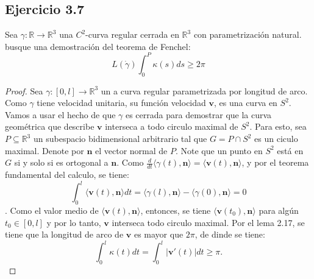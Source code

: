 \documentclass[12pt]{article}
\begin{document}
\subsection*{Ejercicio 3.7}
Sea $\gamma : \mathbb R \rightarrow \mathbb R^3$ una $C^2$-curva regular cerrada en $\mathbb R ^3$ con parametrizaci\'on natural. busque una demostraci\'on del teorema de Fenchel:
\begin{equation*}
L(\dot{\gamma})\int_{0}^{P} \kappa(s)ds \geq 2\pi
\end{equation*}
\begin{proof}
Sea $\gamma : [0, l] \rightarrow \mathbb R ^3$ un a curva regular parametrizada por longitud de arco. Como $\gamma$ tiene velocidad unitaria, su funci\'on velocidad $\textbf{v}$, es una curva en $S^2$. \\
Vamos a usar el hecho de que $\gamma $ es cerrada para demostrar que la curva geom\'etrica que describe $\textbf{v}$ interseca a todo circulo maximal de $S^2$. Para esto, sea $P \subseteq \mathbb R ^3$ un subespacio bidimensional arbitrario tal que $G=P \cap S^2$ es un ciculo maximal. Denote por $\textbf{n}$ el vector normal de $P$. Note que un punto en $S^2$ est\'a en $G$ si y solo si es ortogonal a $\textbf{n}$. Como $\frac{d}{dt}\langle \gamma(t), \textbf{n} \rangle=\langle \textbf{v} (t),\textbf{n}\rangle $, y por el teorema fundamental del calculo, se tiene:\\
 $$ \int_{0}^{l}{\langle \textbf{v}(t),\textbf{n} \rangle}dt = \langle \gamma (l),\textbf{n}\rangle -\langle \gamma (0), \textbf{n} \rangle = 0   $$.
 Como el valor medio de $\langle \textbf{v}(t), \textbf{n} \rangle$, entonces, se tiene $\langle \textbf{v}(t_0), \textbf{n} \rangle$ para alg\'un $t_0 \in [0,l]$ y por lo tanto, $\textbf{v}$ interseca todo circulo maximal. Por el lema 2.17, se tiene que la longitud de arco de $\textbf{v}$ es mayor que $2\pi$, de dinde se tiene:
 $$ \int_{0}^{l}{\kappa (t)}dt= \int_{0}^{l}{|\textbf{v}'(t)|}dt\geq \pi.$$
\end{proof}
\end{document}
